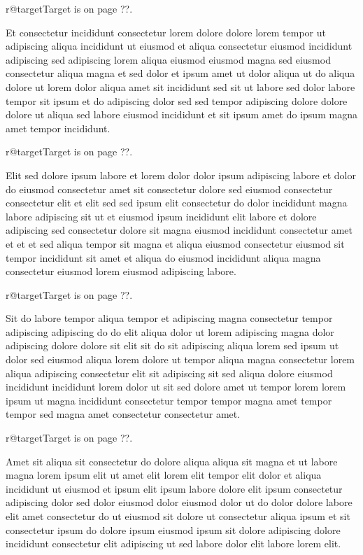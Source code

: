 \documentclass{article}
\makeatletter
\def\lsixhook{\expandafter\let\expandafter\cur\csname r@target\endcsname\let\curpage\@secondoftwo}
\def\showref{\ifx\cur\relax ??\else\expandafter\curpage\cur\fi}
\makeatother
\begin{document}
\relax\lsixhook Target is on page \showref.

Et consectetur incididunt consectetur lorem dolore dolore lorem tempor ut adipiscing aliqua incididunt ut eiusmod et aliqua consectetur eiusmod incididunt adipiscing sed adipiscing lorem aliqua eiusmod eiusmod magna sed eiusmod consectetur aliqua magna et sed dolor et ipsum amet ut dolor aliqua ut do aliqua dolore ut lorem dolor aliqua amet sit incididunt sed sit ut labore sed dolor labore tempor sit ipsum et do adipiscing dolor sed sed tempor adipiscing dolore dolore dolore ut aliqua sed labore eiusmod incididunt et sit ipsum amet do ipsum magna amet tempor incididunt.

\relax\lsixhook Target is on page \showref.

Elit sed dolore ipsum labore et lorem dolor dolor ipsum adipiscing labore et dolor do eiusmod consectetur amet sit consectetur dolore sed eiusmod consectetur consectetur elit et elit sed sed ipsum elit consectetur do dolor incididunt magna labore adipiscing sit ut et eiusmod ipsum incididunt elit labore et dolore adipiscing sed consectetur dolore sit magna eiusmod incididunt consectetur amet et et et sed aliqua tempor sit magna et aliqua eiusmod consectetur eiusmod sit tempor incididunt sit amet et aliqua do eiusmod incididunt aliqua magna consectetur eiusmod lorem eiusmod adipiscing labore.

\relax\lsixhook Target is on page \showref.

Sit do labore tempor aliqua tempor et adipiscing magna consectetur tempor adipiscing adipiscing do do elit aliqua dolor ut lorem adipiscing magna dolor adipiscing dolore dolore sit elit sit do sit adipiscing aliqua lorem sed ipsum ut dolor sed eiusmod aliqua lorem dolore ut tempor aliqua magna consectetur lorem aliqua adipiscing consectetur elit sit adipiscing sit sed aliqua dolore eiusmod incididunt incididunt lorem dolor ut sit sed dolore amet ut tempor lorem lorem ipsum ut magna incididunt consectetur tempor tempor magna amet tempor tempor sed magna amet consectetur consectetur amet.

\relax\lsixhook Target is on page \showref.

Amet sit aliqua sit consectetur do dolore aliqua aliqua sit magna et ut labore magna lorem ipsum elit ut amet elit lorem elit tempor elit dolor et aliqua incididunt ut eiusmod et ipsum elit ipsum labore dolore elit ipsum consectetur adipiscing dolor sed dolor eiusmod dolor eiusmod dolor ut do dolor dolore labore elit amet consectetur do ut eiusmod sit dolore ut consectetur aliqua ipsum et sit consectetur ipsum do dolore ipsum eiusmod ipsum sit dolore adipiscing dolore incididunt consectetur elit adipiscing ut sed labore dolor elit labore lorem elit.
\end{document}
